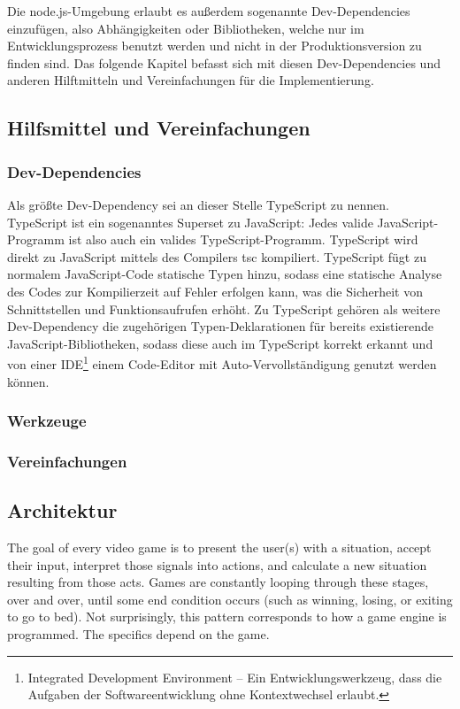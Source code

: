 Die node.js-Umgebung erlaubt es außerdem sogenannte Dev-Dependencies einzufügen, also Abhängigkeiten oder Bibliotheken, welche nur im Entwicklungsprozess benutzt werden und nicht in der Produktionsversion zu finden sind. Das folgende Kapitel befasst sich mit diesen Dev-Dependencies und anderen Hilftmitteln und Vereinfachungen für die Implementierung.
\subsection{Hilfsmittel und Vereinfachungen}
\label{subsec:Hilfsmittel}

\subsubsection{Dev-Dependencies}

Als größte Dev-Dependency sei an dieser Stelle TypeScript zu nennen. TypeScript ist ein sogenanntes Superset zu JavaScript: Jedes valide JavaScript-Programm ist also auch ein valides TypeScript-Programm. TypeScript wird direkt zu JavaScript mittels des Compilers tsc kompiliert. TypeScript fügt zu normalem JavaScript-Code statische Typen hinzu, sodass eine statische Analyse des Codes zur Kompilierzeit auf Fehler erfolgen kann, was die Sicherheit von Schnittstellen und Funktionsaufrufen erhöht. Zu TypeScript gehören als weitere Dev-Dependency die zugehörigen Typen-Deklarationen für bereits existierende JavaScript-Bibliotheken, sodass diese auch im TypeScript korrekt erkannt und von einer IDE\footnote{Integrated Development Environment -- Ein Entwicklungswerkzeug, dass die Aufgaben der Softwareentwicklung ohne Kontextwechsel erlaubt.} \bzw einem Code-Editor mit Auto-Vervollständigung genutzt werden können.

\subsubsection{Werkzeuge}

\subsubsection{Vereinfachungen}


\subsection{Architektur}
\label{subsec:Architektur}
The goal of every video game is to present the user(s) with a situation, accept their input, interpret those signals into actions, and calculate a new situation resulting from those acts. Games are constantly looping through these stages, over and over, until some end condition occurs (such as winning, losing, or exiting to go to bed). Not surprisingly, this pattern corresponds to how a game engine is programmed. The specifics depend on the game. \cite{https://developer.mozilla.org/en-us/docs/games/anatomy}

